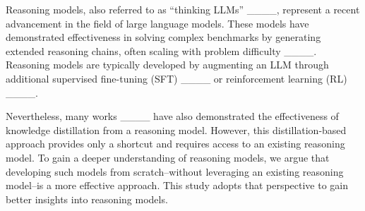 Reasoning models, also referred to as ``thinking LLMs'' ____, represent a recent advancement in the field of large language models. These models have demonstrated effectiveness in solving complex benchmarks by generating extended reasoning chains, often scaling with problem difficulty ____. Reasoning models are typically developed by augmenting an LLM through additional supervised fine-tuning (SFT) ____ or reinforcement learning (RL) ____.

Nevertheless, many works ____ have also demonstrated the effectiveness of knowledge distillation from a reasoning model. However, this distillation-based approach provides only a shortcut and requires access to an existing reasoning model. To gain a deeper understanding of reasoning models, we argue that developing such models from scratch--without leveraging an existing reasoning model--is a more effective approach. This study adopts that perspective to gain better insights into reasoning models.